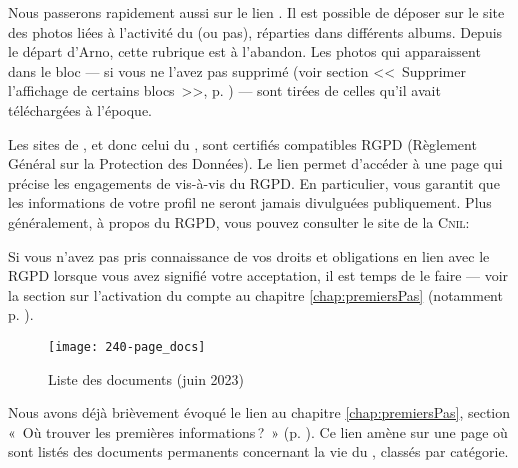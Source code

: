 Nous passerons rapidement aussi sur le lien . Il est possible de déposer sur le site des photos liées à l’activité du \sel{} (ou pas), réparties dans différents albums. Depuis le départ d’Arno, cette rubrique est à l’abandon. Les photos qui apparaissent dans le bloc  --- si vous ne l’avez pas supprimé (voir section <<~Supprimer l'affichage de certains blocs~>>, p. \pageref{sec:supprimerBlocs}) --- sont tirées de celles qu’il avait téléchargées à l’époque.


\label{sec:rgpd}
Les sites de \CF, et donc celui du \CdS, sont certifiés compatibles RGPD (Règlement Général sur la Protection des Données). Le lien  permet d’accéder à une page qui précise les engagements de \CF{} vis-à-vis du RGPD. En particulier, \CF{} vous garantit que les informations de votre profil ne seront jamais divulguées publiquement.
Plus généralement, à propos du RGPD, vous pouvez consulter le site de la \textsc{Cnil}:

\smallskip

\begin{center}
\end{center}

\smallskip

Si vous n’avez pas pris connaissance de vos droits et obligations en lien avec le RGPD lorsque vous avez signifié votre acceptation, il est temps de le faire --- voir la section sur l'activation du compte au chapitre \ref{chap:premiersPas} (notamment p. \pageref{page:accepteRgpd}). 

\label{sec:docs}

\begin{figure}
    \texttt{[image: 240-page\_docs]}
    \caption[Liste des documents]{Liste des documents (juin 2023)}
    \label{fig:listeDocuments}
\end{figure}
Nous avons déjà brièvement évoqué le lien  au chapitre \ref{chap:premiersPas}, section «~Où trouver les premières informations\,?~» (p. \pageref{page:premieresInfos}). Ce lien amène sur une page où sont listés des documents permanents concernant la vie du \sel, classés par catégorie.

